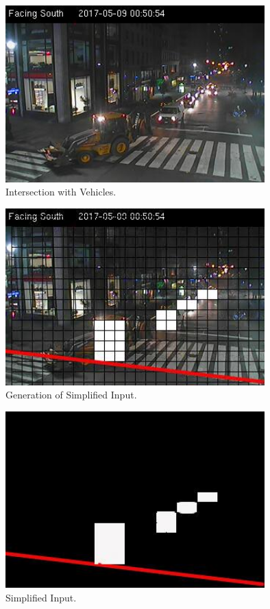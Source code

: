 \documentclass[a4paper,11pt]{article}
\begin{document}
				
				\begin{figure}[!h]
					\begin{centering}
						\includegraphics[width=10cm]{images/traffic2.png}
						\caption{Intersection with Vehicles.}
					\end{centering}
				\end{figure}

				
				\begin{figure}[!h]
					\begin{centering}
						\includegraphics[width=10cm]{images/traffic3.png}
						\caption{Generation of Simplified Input.}
					\end{centering}
				\end{figure}

				
				\begin{figure}[!h]
					\begin{centering}
						\includegraphics[width=10cm]{images/traffic4.png}
						\caption{Simplified Input.}
					\end{centering}
				\end{figure}
\end{document}
